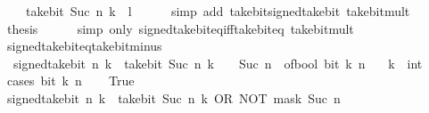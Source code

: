 \begin{isabellebody}
\ \ \ \ take{\isacharunderscore}{\kern0pt}bit\ {\isacharparenleft}{\kern0pt}Suc\ n{\isacharparenright}{\kern0pt}\ {\isacharparenleft}{\kern0pt}k\ {\isacharasterisk}{\kern0pt}\ l{\isacharparenright}{\kern0pt}{\isacartoucheclose}\isanewline
\ \ \ \ \isamarkupfalse%
\ {\isacharparenleft}{\kern0pt}simp\ add{\isacharcolon}{\kern0pt}\ take{\isacharunderscore}{\kern0pt}bit{\isacharunderscore}{\kern0pt}signed{\isacharunderscore}{\kern0pt}take{\isacharunderscore}{\kern0pt}bit\ take{\isacharunderscore}{\kern0pt}bit{\isacharunderscore}{\kern0pt}mult{\isacharparenright}{\kern0pt}\isanewline
\ \ \isamarkupfalse%
\ \isamarkupfalse%
\ {\isacharquery}{\kern0pt}thesis\isanewline
\ \ \ \ \isamarkupfalse%
\ {\isacharparenleft}{\kern0pt}simp\ only{\isacharcolon}{\kern0pt}\ signed{\isacharunderscore}{\kern0pt}take{\isacharunderscore}{\kern0pt}bit{\isacharunderscore}{\kern0pt}eq{\isacharunderscore}{\kern0pt}iff{\isacharunderscore}{\kern0pt}take{\isacharunderscore}{\kern0pt}bit{\isacharunderscore}{\kern0pt}eq\ take{\isacharunderscore}{\kern0pt}bit{\isacharunderscore}{\kern0pt}mult{\isacharparenright}{\kern0pt}\isanewline
{}\isamarkupfalse%
%
\endisatagproof
{\isafoldproof}%
%
\isadelimproof
\isanewline
%
\endisadelimproof
\isanewline
{}\isamarkupfalse%
\ signed{\isacharunderscore}{\kern0pt}take{\isacharunderscore}{\kern0pt}bit{\isacharunderscore}{\kern0pt}eq{\isacharunderscore}{\kern0pt}take{\isacharunderscore}{\kern0pt}bit{\isacharunderscore}{\kern0pt}minus{\isacharcolon}{\kern0pt}\isanewline
\ \ {\isacartoucheopen}signed{\isacharunderscore}{\kern0pt}take{\isacharunderscore}{\kern0pt}bit\ n\ k\ {\isacharequal}{\kern0pt}\ take{\isacharunderscore}{\kern0pt}bit\ {\isacharparenleft}{\kern0pt}Suc\ n{\isacharparenright}{\kern0pt}\ k\ {\isacharminus}{\kern0pt}\ {}\ {\isacharcircum}{\kern0pt}\ Suc\ n\ {\isacharasterisk}{\kern0pt}\ of{\isacharunderscore}{\kern0pt}bool\ {\isacharparenleft}{\kern0pt}bit\ k\ n{\isacharparenright}{\kern0pt}{\isacartoucheclose}\isanewline
\ \ \ k\ {\isacharcolon}{\kern0pt}{\isacharcolon}{\kern0pt}\ int\isanewline
%
\isadelimproof
%
\endisadelimproof
%
\isatagproof
{}\isamarkupfalse%
\ {\isacharparenleft}{\kern0pt}cases\ {\isacartoucheopen}bit\ k\ n{\isacartoucheclose}{\isacharparenright}{\kern0pt}\isanewline
\ \ \isamarkupfalse%
\ True\isanewline
\ \ \isamarkupfalse%
\ {\isacartoucheopen}signed{\isacharunderscore}{\kern0pt}take{\isacharunderscore}{\kern0pt}bit\ n\ k\ {\isacharequal}{\kern0pt}\ take{\isacharunderscore}{\kern0pt}bit\ {\isacharparenleft}{\kern0pt}Suc\ n{\isacharparenright}{\kern0pt}\ k\ OR\ NOT\ {\isacharparenleft}{\kern0pt}mask\ {\isacharparenleft}{\kern0pt}Suc\ n{\isacharparenright}{\kern0pt}{\isacharparenright}{\kern0pt}{\isacartoucheclose}\isanewline

\end{isabellebody}
